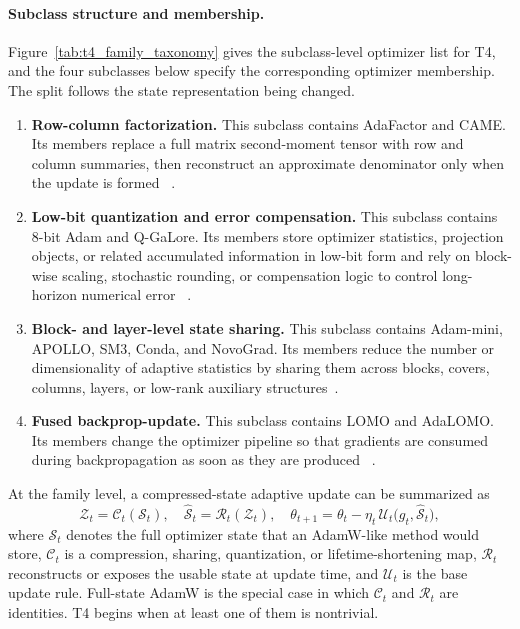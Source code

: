 \paragraph{Subclass structure and membership.}
Figure~\ref{tab:t4_family_taxonomy} gives the subclass-level optimizer list for T4, and the
four subclasses below specify the corresponding optimizer membership.  The
split follows the state representation being changed.
\begin{enumerate}[label=\textbf{T4.\arabic*},leftmargin=*,itemsep=2pt]
  \item \textbf{Row-column factorization.}
  This subclass contains AdaFactor and CAME.  Its members replace a full
  matrix second-moment tensor with row and column summaries, then reconstruct
  an approximate denominator only when the update is formed
  ~\citep{shazeer2018adafactor,luo2023came}.
  \item \textbf{Low-bit quantization and error compensation.}
  This subclass contains 8-bit Adam and Q-GaLore.  Its members store optimizer
  statistics, projection objects, or related accumulated information in
  low-bit form and rely on block-wise scaling, stochastic rounding, or
  compensation logic to control long-horizon numerical error
  ~\citep{dettmers20218,zhang2024q}.
  \item \textbf{Block- and layer-level state sharing.}
  This subclass contains Adam-mini, APOLLO, SM3, Conda, and NovoGrad.  Its
  members reduce the number or dimensionality of adaptive statistics by
  sharing them across blocks, covers, columns, layers, or low-rank auxiliary
  structures~\citep{zhang2025adam,zhu2025apollo,anil2019memory,wang2025conda,ginsburg2019stochastic}.
  \item \textbf{Fused backprop-update.}
  This subclass contains LOMO and AdaLOMO.  Its members change the optimizer
  pipeline so that gradients are consumed during backpropagation as soon as
  they are produced
  ~\citep{lv2024full,lv2024adalomo}.
\end{enumerate}

At the family level, a compressed-state adaptive update can be summarized as
\begin{equation}
  \mathcal{Z}_t = \mathcal{C}_t(\mathcal{S}_t),\quad
  \widehat{\mathcal{S}}_t = \mathcal{R}_t(\mathcal{Z}_t),\quad
  \theta_{t+1}
  =
  \theta_t-\eta_t\,
  \mathcal{U}_t\big(g_t,\widehat{\mathcal{S}}_t\big),
  \label{eq:t4-state-compression-template}
\end{equation}
where $\mathcal{S}_t$ denotes the full optimizer state that an AdamW-like
method would store, $\mathcal{C}_t$ is a compression, sharing, quantization,
or lifetime-shortening map, $\mathcal{R}_t$ reconstructs or exposes the
usable state at update time, and $\mathcal{U}_t$ is the base update rule.
Full-state AdamW is the special case in which $\mathcal{C}_t$ and
$\mathcal{R}_t$ are identities.  T4 begins when at least one of them is
nontrivial.

